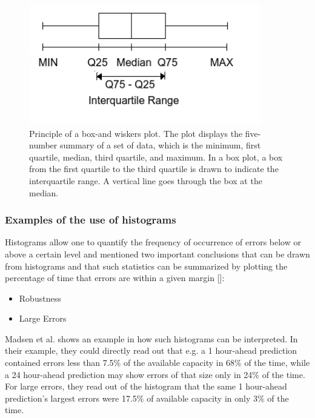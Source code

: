 \begin{figure}[h!]
\includegraphics[width=0.9\textwidth]{figures/box-wiskers-plot.jpg}
\caption{Principle of a box-and wiskers plot. The plot displays the five-number summary of a set of data, which is the minimum, first quartile, median, third quartile, and maximum. In a box plot, a box from the first quartile to the third quartile is drawn to indicate the interquartile range. A vertical line goes through the box at the median.}
\label{fig:boxplot}
\end{figure}



\subsubsection{Examples of the use of histograms}\label{subsec:historgram}

Histograms allow one to quantify the frequency of occurrence of errors below or above a certain level and mentioned two important conclusions that can be drawn from histograms and that such statistics can be summarized by plotting the percentage of time that errors are within a given margin [\cite{madsen2005}]:\\
\begin{itemize}
    \item Robustness
    \item Large Errors
\end{itemize}

Madsen et al. \cite{madsen2005} shows an example in how such histograms can be interpreted. In their example, they could directly read out that e.g. a 1 hour-ahead prediction contained errors less than 7.5\% of the available capacity in 68\% of the time, while a 24 hour-ahead prediction may show errors of that size only in 24\% of the time. For large errors, they read out of the histogram that the same 1 hour-ahead prediction's largest errors were 17.5\% of available capacity in only 3\% of the time.


